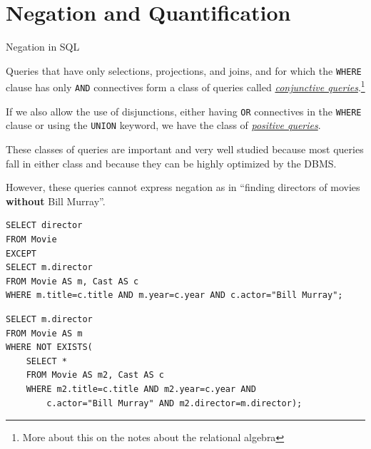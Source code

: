 \documentclass[xcolor={usenames,dvipsnames}]{beamer}
\begin{document}
%
%
%
%

\section{Negation and Quantification}

%
%

\begin{frame}{Negation in SQL}

Queries that have only selections, projections, and joins, and for which the \lstinline[style=SQL]{WHERE} clause has only \lstinline[style=SQL]{AND} connectives form a class of queries called \underline{\emph{conjunctive queries}}.\footnote{More about this on the notes about the relational algebra}

If we also allow the use of disjunctions, either having \lstinline[style=SQL]{OR} connectives in the \lstinline[style=SQL]{WHERE} clause or using the \lstinline[style=SQL]{UNION} keyword, we have the class of \underline{\emph{positive queries}}.

These classes of queries are important and very well studied because most queries fall in either class and because they can be highly optimized by the DBMS.

However, these queries cannot express negation as in ``finding directors of movies \textbf{without} Bill Murray''.
\end{frame}

%
%


\newsavebox{\NEGATIONi}
\begin{lrbox}{\NEGATIONi}
\begin{lstlisting}[style=SQL]
SELECT director 
FROM Movie
EXCEPT
SELECT m.director
FROM Movie AS m, Cast AS c
WHERE m.title=c.title AND m.year=c.year AND c.actor="Bill Murray";
\end{lstlisting}
\end{lrbox}

\newsavebox{\NEGATIONii}
\begin{lrbox}{\NEGATIONii}
\begin{lstlisting}[style=SQL]
SELECT m.director 
FROM Movie AS m
WHERE NOT EXISTS(
    SELECT *
    FROM Movie AS m2, Cast AS c
    WHERE m2.title=c.title AND m2.year=c.year AND 
        c.actor="Bill Murray" AND m2.director=m.director);
\end{lstlisting}
\end{lrbox}
\end{document}
